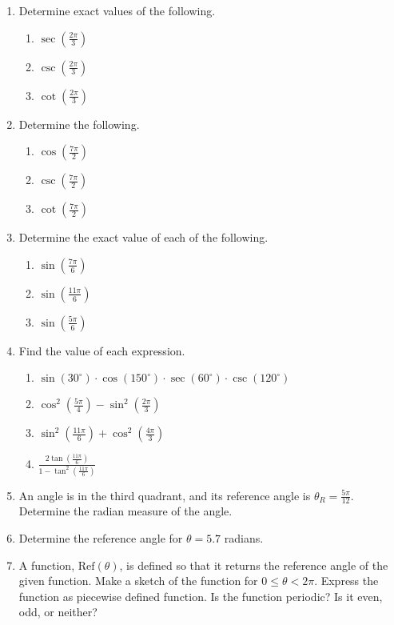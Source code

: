 \begin{enumerate}
\item  Determine exact values of the following.
  \begin{enumerate}
  \item $\sec\left(\frac{2\pi}{3}\right)$
  \item $\csc\left(\frac{2\pi}{3}\right)$
  \item $\cot\left(\frac{2\pi}{3}\right)$
  \end{enumerate}
\item Determine the following.
  \begin{enumerate}
  \item $\cos\left(\frac{7\pi}{2}\right)$
  \item $\csc\left(\frac{7\pi}{2}\right)$
  \item $\cot\left(\frac{7\pi}{2}\right)$
  \end{enumerate}
\item Determine the exact value of each of the following. %
  \begin{enumerate}
  \item $\sin\left(\frac{7\pi}{6}\right)$ 
  \item $\sin\left(\frac{11\pi}{6}\right)$
  \item $\sin\left(\frac{5\pi}{6}\right)$ 
  \end{enumerate}
\item Find the value of each expression.
  \begin{enumerate}
  \item $\sin\left(30^\circ\right)\cdot \cos\left(150^\circ\right)\cdot \sec\left(60^\circ\right)\cdot \csc\left(120^\circ\right)$
  \item $\cos^2\left(\frac{5\pi}{4}\right)-\sin^2\left(\frac{2\pi}{3}\right)$
  \item $\sin^2\left(\frac{11\pi}{6}\right)+\cos^2\left(\frac{4\pi}{3}\right)$
  \item $\displaystyle \frac{2\tan\left(\frac{11\pi}{6}\right)}{1-\tan^2\left(\frac{11\pi}{6}\right)}$
  \end{enumerate}
\item An angle is in the third quadrant, and its reference angle is
  $\theta_R=\frac{5\pi}{12}$. Determine the radian measure of the
  angle.
\item Determine the reference angle for $\theta=5.7$ radians.
\item A function, $\textrm{Ref}(\theta)$, is defined so that it
  returns the reference angle of the given function. Make a sketch of
  the function for $0\leq\theta < 2\pi$. Express the function as
  piecewise defined function. Is the function periodic? Is it even,
  odd, or neither?


\end{enumerate}
